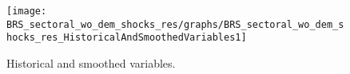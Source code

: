  
\begin{figure}[H]
\centering 
\texttt{[image: BRS\_sectoral\_wo\_dem\_shocks\_res/graphs/BRS\_sectoral\_wo\_dem\_shocks\_res\_HistoricalAndSmoothedVariables1]}
\caption{Historical and smoothed variables.}\label{Fig:HistoricalAndSmoothedVariables:1}
\end{figure}


